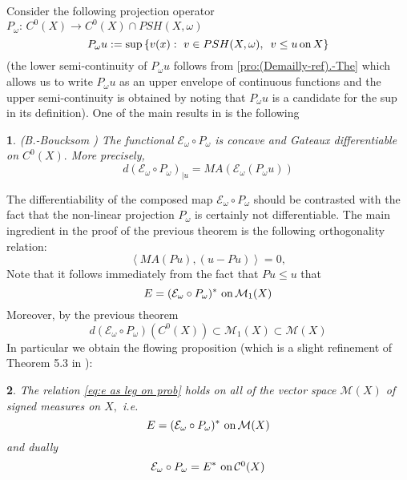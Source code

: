 \documentclass[11pt,oneside,english]{amsart}
\numberwithin{equation}{section}
\numberwithin{figure}{section}
\theoremstyle{plain}
\newtheorem{thm}{\protect\theoremname}[section]
\theoremstyle{plain}
\theoremstyle{plain}
\theoremstyle{plain}
\newtheorem{prop}[thm]{\protect\propositionname}
\theoremstyle{remark}
\theoremstyle{definition}
\providecommand{\propositionname}{Proposition}
\providecommand{\theoremname}{Theorem}
\begin{document}
Consider the following projection operator $P_{\omega}:\, C^{0}(X)\rightarrow C^{0}(X)\cap PSH(X,\omega)$
\[
P_{\omega}u:=\sup\left\{ v(x):\,\, v\in PSH(X,\omega),\,\,\, v\leq u\,\mbox{on\,\ensuremath{X}}\right\} 
\]
 (the lower semi-continuity of $P_{\omega}u$ follows from \ref{pro:(Demailly-ref).-The}
which allows us to write $P_{\omega}u$ as an upper envelope of continuous
functions and the upper semi-continuity is obtained by noting that
$P_{\omega}u$ is a candidate for the sup in its definition). One
of the main results in \cite{b-b} is the following 
\begin{thm}
(B.-Boucksom \cite{b-b}) The functional $\mathcal{E_{\omega}}\circ P_{\omega}$
is concave and Gateaux differentiable on $C^{0}(X).$ More precisely,
\[
d(\mathcal{E_{\omega}}\circ P_{\omega})_{|u}=MA(\mathcal{E_{\omega}}(P_{\omega}u))
\]

\end{thm}
The differentiability of the composed map $\mathcal{E_{\omega}}\circ P_{\omega}$
should be contrasted with the fact that the non-linear projection
$P_{\omega}$ is certainly not differentiable. The main ingredient
in the proof of the previous theorem is the following orthogonality
relation: 
\begin{equation}
\left\langle MA(Pu),(u-Pu)\right\rangle =0,\label{eq:orthog relation}
\end{equation}
 Note that it follows immediately from the fact that $Pu\leq u$ that
\begin{equation}
E=(\mathcal{E_{\omega}}\circ P_{\omega})^{*}\,\,\mbox{on\,\ensuremath{\mathcal{M}_{1}(X)}}\label{eq:e as leg on prob}
\end{equation}
 Moreover, by the previous theorem 
\begin{equation}
d(\mathcal{E_{\omega}}\circ P_{\omega})(C^{0}(X))\subset\mathcal{M}_{1}(X)\subset\mathcal{M}(X)\label{eq:diff is prob}
\end{equation}
In particular we obtain the flowing proposition (which is a slight
refinement of Theorem 5.3 in \cite{bbgz}): 
\begin{prop}
\label{pro:legendre duality for energies}The relation \ref{eq:e as leg on prob}
holds on all of the vector space $\mathcal{M}(X)$ of signed measures
on $X,$ i.e. 
\[
E=(\mathcal{E_{\omega}}\circ P_{\omega})^{*}\,\,\mbox{on\,\ensuremath{\mathcal{M}(X)}}
\]
 and dually 
\[
\mathcal{E_{\omega}}\circ P_{\omega}=E^{*}\,\,\mbox{on\,\ensuremath{\mathcal{C}^{0}(X)}}
\]
 \end{prop}
\end{document}
